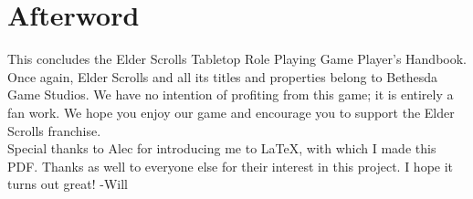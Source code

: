 \chapter*{Afterword}
This concludes the Elder Scrolls Tabletop Role Playing Game Player's Handbook. Once again, Elder Scrolls and all its titles and properties belong to Bethesda Game Studios. We have no intention of profiting from this game; it is entirely a fan work. We hope you enjoy our game and encourage you to support the Elder Scrolls franchise.\\

Special thanks to Alec for introducing me to LaTeX, with which I made this PDF. Thanks as well to everyone else for their interest in this project. I hope it turns out great! -Will